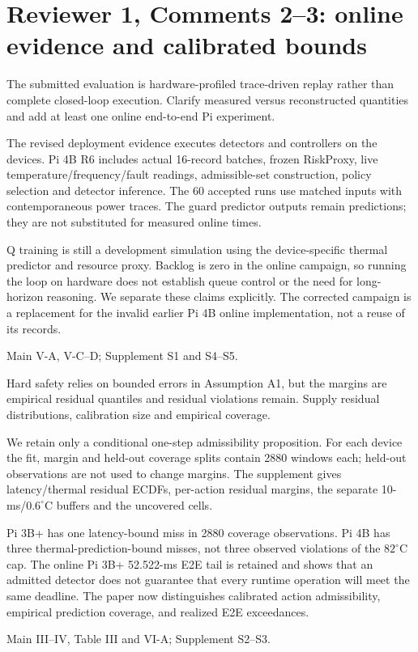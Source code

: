 \documentclass[10pt,a4paper]{article}
\newcommand{\commentbox}[1]{\begin{rcommentbox}#1\end{rcommentbox}}
\newcommand{\responsebox}[1]{\begin{authorresponsebox}#1\end{authorresponsebox}}
\newcommand{\changebox}[1]{\begin{wherebox}#1\end{wherebox}}
\begin{document}
\clearpage
\section*{Reviewer 1, Comments 2--3: online evidence and calibrated bounds}
\commentbox{The submitted evaluation is hardware-profiled trace-driven replay rather than complete closed-loop execution. Clarify measured versus reconstructed quantities and add at least one online end-to-end Pi experiment.}
\responsebox{The revised deployment evidence executes detectors and controllers on the devices. Pi 4B R6 includes actual 16-record batches, frozen RiskProxy, live temperature/frequency/fault readings, admissible-set construction, policy selection and detector inference. The 60 accepted runs use matched inputs with contemporaneous power traces. The guard predictor outputs remain predictions; they are not substituted for measured online times.

Q training is still a development simulation using the device-specific thermal predictor and resource proxy. Backlog is zero in the online campaign, so running the loop on hardware does not establish queue control or the need for long-horizon reasoning. We separate these claims explicitly. The corrected campaign is a replacement for the invalid earlier Pi 4B online implementation, not a reuse of its records.}
\changebox{Main V-A, V-C--D; Supplement S1 and S4--S5.}
\commentbox{Hard safety relies on bounded errors in Assumption A1, but the margins are empirical residual quantiles and residual violations remain. Supply residual distributions, calibration size and empirical coverage.}
\responsebox{We retain only a conditional one-step admissibility proposition. For each device the fit, margin and held-out coverage splits contain 2880 windows each; held-out observations are not used to change margins. The supplement gives latency/thermal residual ECDFs, per-action residual margins, the separate 10-ms/$0.6^\circ$C buffers and the uncovered cells.

Pi 3B+ has one latency-bound miss in 2880 coverage observations. Pi 4B has three thermal-prediction-bound misses, not three observed violations of the $82^\circ$C cap. The online Pi 3B+ 52.522-ms E2E tail is retained and shows that an admitted detector does not guarantee that every runtime operation will meet the same deadline. The paper now distinguishes calibrated action admissibility, empirical prediction coverage, and realized E2E exceedances.}
\changebox{Main III--IV, Table III and VI-A; Supplement S2--S3.}
\end{document}
